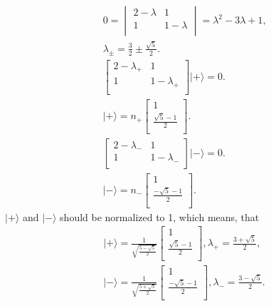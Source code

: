 \documentclass[a4paper,12pt]{article}
\newcommand{\ra}{\rangle}
\begin{document}
    \begin{gather}
        \nonumber
        0 =
        \begin{vmatrix}
            2 - \lambda & 1\\
            1 & 1 - \lambda\\
        \end{vmatrix} =
        \lambda^2 - 3 \lambda + 1 \textrm{,} \\
        \nonumber
        \lambda_\pm = \frac{3}{2} \pm \frac{\sqrt{5}}{2} \textrm{.} \\
        \nonumber
        \begin{bmatrix}
            2 - \lambda_+ & 1\\
            1 & 1 - \lambda_+\\
        \end{bmatrix}
        | + \ra = 0 \textrm{.} \\
        \nonumber
        | + \ra = n_+
        \begin{bmatrix}
            1\\
            \frac{\sqrt{5} - 1}{2}\\
        \end{bmatrix} \textrm{.}\\
        \nonumber
        \begin{bmatrix}
            2 - \lambda_- & 1\\
            1 & 1 - \lambda_-\\
        \end{bmatrix}
        \nonumber
        | - \ra = 0 \textrm{.} \\
        | - \ra = n_-
        \begin{bmatrix}
            1\\
            \frac{-\sqrt{5} - 1}{2}\\
        \end{bmatrix} \textrm{.}
    \end{gather}
    $|+\ra$ and $|-\ra$ should be normalized to 1, which means, that
    \begin{gather}
        \nonumber
        | + \ra =
        \frac{1}{\sqrt{\frac{5 - \sqrt{5}}{2}}}
        \begin{bmatrix}
            1\\
            \frac{\sqrt{5} - 1}{2}\\
        \end{bmatrix} , \lambda_+ = \frac{3 + \sqrt{5}}{2} \textrm{,}\\
        | - \ra =
        \frac{1}{\sqrt{\frac{5 + \sqrt{5}}{2}}}
        \begin{bmatrix}
            1\\
            \frac{-\sqrt{5} - 1}{2}\\
        \end{bmatrix} , \lambda_- = \frac{3 - \sqrt{5}}{2} \textrm{.}
    \end{gather}
\end{document}
